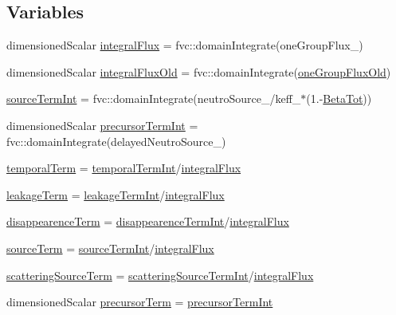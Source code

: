 \subsection*{Variables}
\begin{DoxyCompactItemize}
\item 
dimensioned\+Scalar \hyperlink{integralPredictorSP3_8H_a2a0b08b13037e807e2dd9a5db5f493fa}{integral\+Flux} = fvc\+::domain\+Integrate(one\+Group\+Flux\+\_\+)
\item 
dimensioned\+Scalar \hyperlink{integralPredictorSP3_8H_a96a9327735ca0a4dbb1ca5b12a8f209a}{integral\+Flux\+Old} = fvc\+::domain\+Integrate(\hyperlink{integralPredictorSP3_8H_a34c5d9843ad8c67cedc393b8b7e6d3a0}{one\+Group\+Flux\+Old})
\item 
\hyperlink{integralPredictorSP3_8H_aa5ae446f24d87e14d8bd4df6d043998e}{source\+Term\+Int} = fvc\+::domain\+Integrate(neutro\+Source\+\_\+/keff\+\_\+$\ast$(1.-\/\hyperlink{setXSFieldsSN_8H_a3ad4facb2dd0406d605dcb63190ce6f1}{Beta\+Tot}))
\item 
dimensioned\+Scalar \hyperlink{integralPredictorSP3_8H_a6f122f03262179afd60cc84232ee4bf9}{precursor\+Term\+Int} = fvc\+::domain\+Integrate(delayed\+Neutro\+Source\+\_\+)
\item 
\hyperlink{integralPredictorSP3_8H_aaef87b89b227970fd6792c5bff5dcf92}{temporal\+Term} = \hyperlink{integralPredictorSP3_8H_a6a6bc2b4b802b67f7144e4fd168ce1b5}{temporal\+Term\+Int}/\hyperlink{integralPredictorSP3_8H_a2a0b08b13037e807e2dd9a5db5f493fa}{integral\+Flux}
\item 
\hyperlink{integralPredictorSP3_8H_a3870febfb4d6b903e191a3f6937b92e7}{leakage\+Term} = \hyperlink{integralPredictorSP3_8H_a1edc21b2e8fa9d1796ee10236abc2889}{leakage\+Term\+Int}/\hyperlink{integralPredictorSP3_8H_a2a0b08b13037e807e2dd9a5db5f493fa}{integral\+Flux}
\item 
\hyperlink{integralPredictorSP3_8H_af8dbaf3ece9644da11df447a12a14051}{disappearence\+Term} = \hyperlink{integralPredictorSP3_8H_af3f24745c62331a2c7c7bd0dead37b6a}{disappearence\+Term\+Int}/\hyperlink{integralPredictorSP3_8H_a2a0b08b13037e807e2dd9a5db5f493fa}{integral\+Flux}
\item 
\hyperlink{integralPredictorSP3_8H_a917a012199c77c70638448d199750771}{source\+Term} = \hyperlink{integralPredictorSP3_8H_ac69cf9b0ca49bbc73bbd8757cc3ebae3}{source\+Term\+Int}/\hyperlink{integralPredictorSP3_8H_a2a0b08b13037e807e2dd9a5db5f493fa}{integral\+Flux}
\item 
\hyperlink{integralPredictorSP3_8H_a9aa913bf9329cc3ad657343f9e96ceeb}{scattering\+Source\+Term} = \hyperlink{integralPredictorSP3_8H_a6c06ef7a771d3996b52235080e43589b}{scattering\+Source\+Term\+Int}/\hyperlink{integralPredictorSP3_8H_a2a0b08b13037e807e2dd9a5db5f493fa}{integral\+Flux}
\item 
dimensioned\+Scalar \hyperlink{integralPredictorSP3_8H_a036c76c07f219017fb5141b4e0bdc0d7}{precursor\+Term} = \hyperlink{integralPredictorSP3_8H_a6f122f03262179afd60cc84232ee4bf9}{precursor\+Term\+Int}
\end{DoxyCompactItemize}


